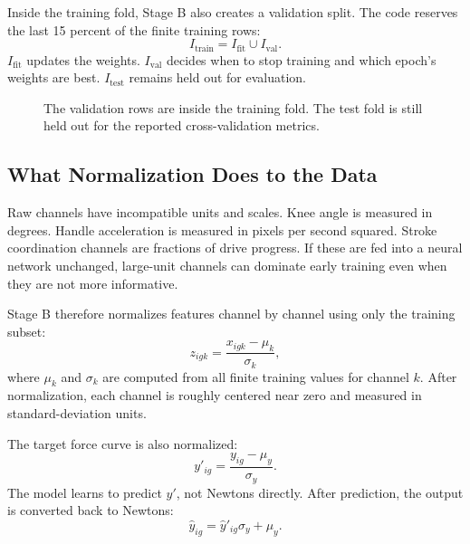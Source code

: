 \documentclass[11pt]{article}
\begin{document}
Inside the training fold, Stage B also creates a validation split. The code
reserves the last 15 percent of the finite training rows:
\[
  I_{\text{train}}
  =
  I_{\text{fit}} \cup I_{\text{val}}.
\]
\(I_{\text{fit}}\) updates the weights. \(I_{\text{val}}\) decides when to stop
training and which epoch's weights are best. \(I_{\text{test}}\) remains held
out for evaluation.

\begin{figure}[H]
  \centering
  \caption{The validation rows are inside the training fold. The test fold is
  still held out for the reported cross-validation metrics.}
  \label{fig:stageb-fit-val-test}
\end{figure}

\subsection{What Normalization Does to the Data}

Raw channels have incompatible units and scales. Knee angle is measured in
degrees. Handle acceleration is measured in pixels per second squared. Stroke
coordination channels are fractions of drive progress. If these are fed into a
neural network unchanged, large-unit channels can dominate early training even
when they are not more informative.

Stage B therefore normalizes features channel by channel using only the
training subset:
\[
  z_{igk}
  =
  \frac{x_{igk}-\mu_k}{\sigma_k},
\]
where \(\mu_k\) and \(\sigma_k\) are computed from all finite training values
for channel \(k\). After normalization, each channel is roughly centered near
zero and measured in standard-deviation units.

The target force curve is also normalized:
\[
  y'_{ig}
  =
  \frac{y_{ig}-\mu_y}{\sigma_y}.
\]
The model learns to predict \(y'\), not Newtons directly. After prediction,
the output is converted back to Newtons:
\[
  \hat{y}_{ig}
  =
  \hat{y}'_{ig}\sigma_y+\mu_y.
\]
\end{document}
